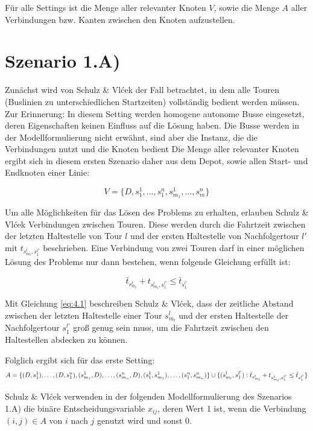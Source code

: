 Für alle Settings ist die Menge aller relevanter Knoten $V$, sowie die Menge $A$ aller Verbindungen bzw. Kanten zwischen den Knoten aufzustellen.

\section{Szenario 1.A)}
\label{sec:4.2}
\label{sec:Szenario 1.A)}
Zunächst wird von Schulz \& Vlćek der Fall betrachtet, in dem alle Touren (Buslinien zu unterschiedlichen Startzeiten) vollständig bedient werden müssen. Zur Erinnerung: In diesem Setting werden homogene autonome Busse eingesetzt, deren Eigenschaften keinen Einfluss auf die Lösung haben. Die Busse werden in der Modellformulierung nicht erwähnt, sind aber die Instanz, die die Verbindungen nutzt und die Knoten bedient
Die Menge aller relevanter Knoten ergibt sich in diesem ersten Szenario daher aus dem Depot, sowie allen Start- und Endknoten einer Linie:

\[
V = \{ D, s^1_1, \dots, s^n_1, s^1_{m_1}, \dots, s^n_m \}
\]

Um alle Möglichkeiten für das Lösen des Problems zu erhalten, erlauben Schulz \& Vlćek Verbindungen zwischen Touren. Diese werden durch die Fahrtzeit zwischen der letzten Haltestelle von Tour $l$ und der ersten Haltestelle von Nachfolgertour $l'$ mit $t_{s^l_{m_l}, s^{l'}_1}$ beschrieben. Eine Verbindung von zwei Touren darf in einer möglichen Lösung des Problems nur dann bestehen, wenn folgende Gleichung erfüllt ist: 

\begin{equation}
    \label{eq:4.1}
    \bar{t}_{s^l_{m_l}} + t_{s^l_{m_l}, s^{l'}_1} \leq \bar{t}_{s^{l'}_1}
\end{equation}

Mit Gleichung \ref{eq:4.1} beschreiben Schulz \& Vlćek, dass der zeitliche Abstand zwischen der letzten Haltestelle einer Tour $s^l_{m_l}$ und der ersten Haltestelle der Nachfolgertour $s^{l'}_1$ groß genug sein muss, um die Fahrtzeit zwischen den Haltestellen abdecken zu können.

Folglich ergibt sich für das erste Setting:
\[
A = \{(D, s_1^1), \ldots, (D, s_1^n), (s_{m_1}^1, D), \ldots, (s_{m_n}^n, D), (s_1^1, s_{m_1}^1), \ldots, (s_1^n, s_{m_n}^n)\}   \\   
\cup \{(s_{m_l}^l, s_1^{l'}) : \bar{t}_{s_{m_l}^l} + t_{s_{m_l}^l, s_1^{l'}} \leq \bar{t}_{s_1^{l'}}\}
\]

Schulz \& Vlćek verwenden in der folgenden Modellformulierung des Szenarios 1.A) die binäre Entscheidungsvariable $x_{ij}$, deren Wert 1 ist, wenn die Verbindung $(i,j) \in A$ von $i$ nach $j$  genutzt wird und sonst 0.

